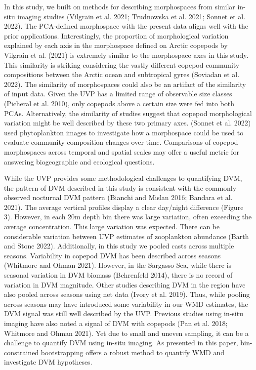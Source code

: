 \documentclass[
]{article}
\begin{document}
In this study, we built on methods for describing morphospaces from
similar in-situ imaging studies (Vilgrain et al. 2021; Trudnowska et al.
2021; Sonnet et al. 2022). The PCA-defined morphospace with the present
data aligns well with the prior applications. Interestingly, the
proportion of morphological variation explained by each axis in the
morphospace defined on Arctic copepods by Vilgrain et al. (2021) is
extremely similar to the morphospace axes in this study. This similarity
is striking considering the vastly different copepod community
compositions between the Arctic ocean and subtropical gyres (Soviadan et
al. 2022). The similarity of morphospaces could also be an artifact of
the similarity of input data. Given the UVP has a limited range of
observable size classes (Picheral et al. 2010), only copepods above a
certain size were fed into both PCAs. Alternatively, the similarity of
studies suggest that copepod morphological variation might be well
described by these two primary axes. (Sonnet et al. 2022) used
phytoplankton images to investigate how a morphospace could be used to
evaluate community composition changes over time. Comparisons of copepod
morphospaces across temporal and spatial scales may offer a useful
metric for answering biogeographic and ecological questions.

While the UVP provides some methodological challenges to quantifying
DVM, the pattern of DVM described in this study is consistent with the
commonly observed nocturnal DVM pattern (Bianchi and Mislan 2016;
Bandara et al. 2021). The average vertical profiles display a clear
day/night difference (Figure 3). However, in each 20m depth bin there
was large variation, often exceeding the average concentration. This
large variation was expected. There can be considerable variation
between UVP estimates of zooplankton abundance (Barth and Stone 2022).
Additionally, in this study we pooled casts across multiple seasons.
Variability in copepod DVM has been described across seasons (Whitmore
and Ohman 2021). However, in the Sargasso Sea, while there is seasonal
variation in DVM biomass (Behrenfeld 2014), there is no record of
variation in DVM magnitude. Other studies describing DVM in the region
have also pooled across seasons using net data (Ivory et al. 2019).
Thus, while pooling across seasons may have introduced some variability
in our WMD estimates, the DVM signal was still well described by the
UVP. Previous studies using in-situ imaging have also noted a signal of
DVM with copepods (Pan et al. 2018; Whitmore and Ohman 2021). Yet due to
small and uneven sampling, it can be a challenge to quantify DVM using
in-situ imaging. As presented in this paper, bin-constrained
bootstrapping offers a robust method to quantify WMD and investigate DVM
hypotheses.
\end{document}
